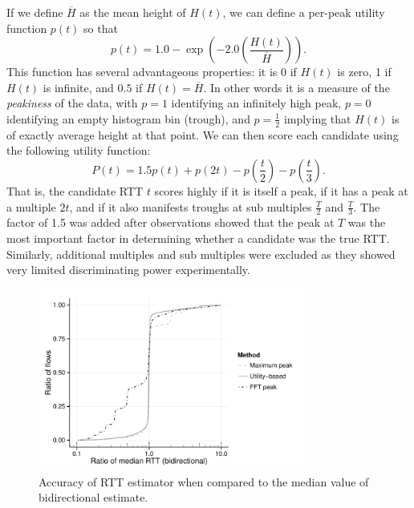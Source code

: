 If we define $\overline{H}$ as the mean height of $H(t)$, we can define a per-peak utility function $p(t)$ so that 
\begin{equation*}
p(t) = 1.0 - \exp\left(-2.0 \left(\frac{H(t)}{\overline{H}}\right)\right) \mbox{.}
\end{equation*}
This function has several advantageous properties: it is 0 if $H(t)$ is zero, 1 if $H(t)$ is infinite, and $0.5$ if $H(t) = \overline{H}$.  
In other words it is a measure of the \emph{peakiness} of the data, with $p=1$ identifying an infinitely high peak, $p=0$ identifying an empty histogram bin (trough), and $p=\frac{1}{2}$ implying that $H(t)$ is of exactly average height at that point. 
We can then score each candidate using the following utility function:
$$
P(t) = 1.5 p(t) + p(2t) - p\left(\frac{t}{2}\right) - p\left(\frac{t}{3}\right).
$$
That is, the candidate \ac{RTT} $t$ scores highly if it is itself a peak, if it has a peak at a multiple $2t$, and if it also manifests troughs at sub multiples $\frac{T}{2}$ and $\frac{T}{3}$.
The factor of 1.5 was added after observations showed that the peak at $T$ was the most important factor in determining whether a candidate was the true \ac{RTT}. 
Similarly, additional multiples and sub multiples were excluded as they showed very limited discriminating power experimentally.

\begin{figure}
  \centering
  \includegraphics[width=0.8\textwidth]{figures/malawi/rttcomp.pdf}
  \caption{Accuracy of \ac{RTT} estimator when compared to the median value of bidirectional estimate.}
\end{figure}

